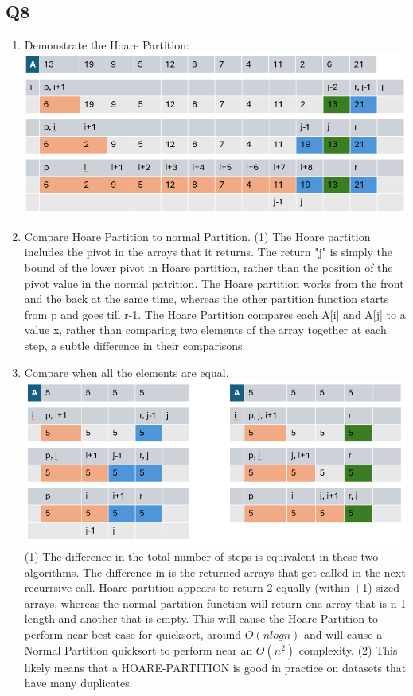\documentclass{article}
\begin{document}
\subsection*{Q8}
\begin{enumerate}[label=(\alph*)]
    \item Demonstrate the Hoare Partition:
    \subitem \includegraphics[width=1\textwidth]{hoarePartition.png}

    \item Compare Hoare Partition to normal Partition.
    \subitem (1) The Hoare partition includes the pivot in the arrays that it returns. The return "j" is simply the bound of the lower pivot in Hoare partition, rather than the position of the pivot value in the normal patrition. The Hoare partition works from the front and the back at the same time, whereas the other partition function starts from p and goes till r-1. The Hoare Partition compares each A[i] and A[j] to a value x, rather than comparing two elements of the array together at each step, a subtle difference in their comparisons.

    \item Compare when all the elements are equal.
    \subitem \includegraphics[width=1\textwidth]{comparingPartitions.png}
    \subitem (1) The difference in the total number of steps is equivalent in these two algorithms. The difference in is the returned arrays that get called in the next recurrsive call. Hoare partition appears to return 2 equally (within +1) sized arrays, whereas the normal partition function will return one array that is n-1 length and another that is empty. This will cause the Hoare Partition to perform near best case for quicksort, around $O(nlogn)$ and will cause a Normal Partition quicksort to perform near an $O(n^2)$ complexity.
    \subitem (2) This likely means that a HOARE-PARTITION is good in practice on datasets that have many duplicates.
    

\end{enumerate}
\end{document}
